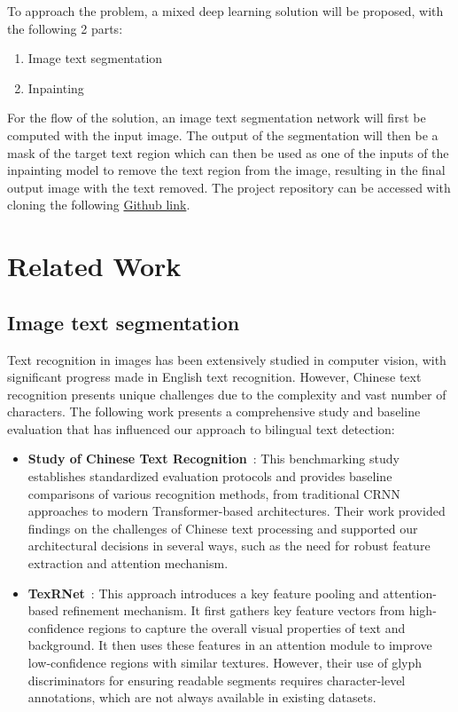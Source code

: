 \documentclass[10pt,twocolumn,letterpaper]{article}
\begin{document}
To approach the problem, a mixed deep learning solution will be proposed, with the following 2 parts:

\begin{enumerate}
  \item Image text segmentation
  \item Inpainting
\end{enumerate}

For the flow of the solution, an image text segmentation network will first be computed with the input image.
The output of the segmentation will then be a mask of the target text region which can then be used as one of the inputs of the 
inpainting model to remove the text region from the image, resulting in the final output image with the text removed. The 
project repository can be accessed with cloning the following \href{https://github.com/GLGDLY/ELEC4240_project}{Github link}.

\section{Related Work}
\label{sec:related_work}

\subsection{Image text segmentation}

Text recognition in images has been extensively studied in computer vision, with significant progress made in English text recognition. 
However, Chinese text recognition presents unique challenges due to the complexity and vast number of characters. 
The following work presents a comprehensive study and baseline evaluation that has influenced our approach to bilingual text detection:

\begin{itemize}
    \item \textbf{Study of Chinese Text Recognition}~\cite{Yu2022}: This benchmarking study establishes standardized evaluation protocols and provides 
    baseline comparisons of various recognition methods, from traditional CRNN approaches to modern Transformer-based architectures. Their work provided 
    findings on the challenges of Chinese text processing and supported our architectural decisions in several ways, such as the need for 
    robust feature extraction and attention mechanism. 

    \item \textbf{TexRNet}~\cite{Xu2020}: This approach introduces a key feature pooling and attention-based refinement mechanism. It first 
    gathers key feature vectors from high-confidence regions to capture the overall visual properties of text and background. It then uses these features in an attention module 
    to improve low-confidence regions with similar textures. However, their use of glyph discriminators for ensuring readable segments requires character-level annotations, 
    which are not always available in existing datasets.
    
\end{itemize}
\end{document}

